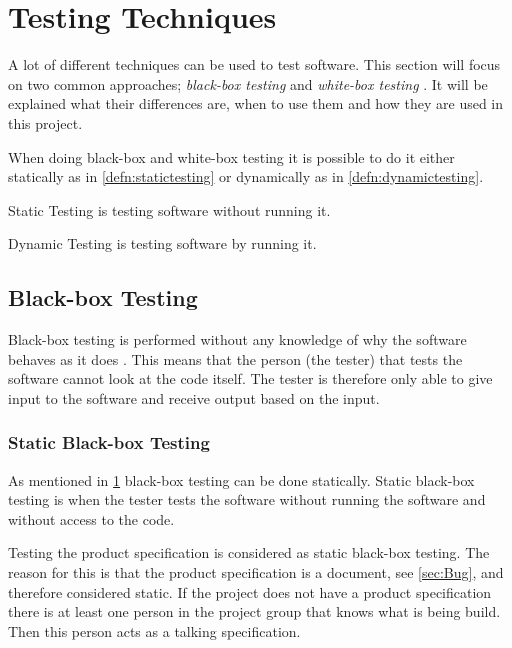 \documentclass[../../master.tex]{subfiles}
\begin{document}
\section{Testing Techniques} \label{sec:testingtechniques}
A lot of different techniques can be used to test software.
This section will focus on two common approaches; \textit{black-box testing} and \textit{white-box testing} \cite{SoftwareTesting}.
It will be explained what their differences are, when to use them and how they are used in this project.

When doing black-box and white-box testing it is possible to do it either statically as in \cref{defn:statictesting} or dynamically as in \cref{defn:dynamictesting}.

\begin{defn} \label{defn:statictesting}
Static Testing is testing software without running it.
\end{defn}

\begin{defn} \label{defn:dynamictesting}
Dynamic Testing is testing software by running it.
\end{defn}

\subsection{Black-box Testing} \label{sec:blackboxtesting}
Black-box testing is performed without any knowledge of why the software behaves as it does \cite{SoftwareTesting}.
This means that the person (the tester) that tests the software cannot look at the code itself.
The tester is therefore only able to give input to the software and receive output based on the input.

\subsubsection{Static Black-box Testing}
As mentioned in \cref{sec:testingtechniques} black-box testing can be done statically.
Static black-box testing is when the tester tests the software without running the software and without access to the code.

Testing the product specification is considered as static black-box testing.
The reason for this is that the product specification is a document, see \cref{sec:Bug}, and therefore considered static.
If the project does not have a product specification there is at least one person in the project group that knows what is being build.
Then this person acts as a talking specification. \cite{SoftwareTesting}
\end{document}
